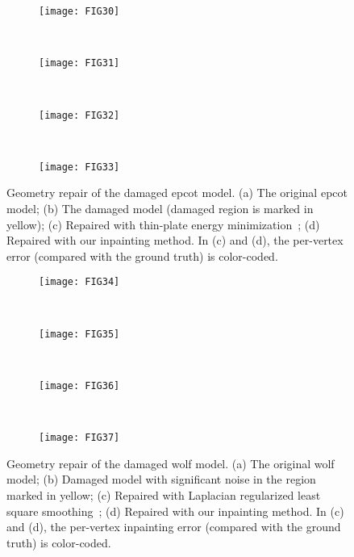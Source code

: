\begin{figure}
    \centering
    \begin{subfigure}[b]{0.23\linewidth}
        \texttt{[image: FIG30]}
        \caption{}
    \end{subfigure}%
    ~
    \begin{subfigure}[b]{0.23\linewidth}
        \texttt{[image: FIG31]}
        \caption{}
    \end{subfigure}
    ~
    \begin{subfigure}[b]{0.23\linewidth}
        \texttt{[image: FIG32]}
        \caption{}
    \end{subfigure}
    ~
    \begin{subfigure}[b]{0.23\linewidth}
        \texttt{[image: FIG33]}
        \caption{}
    \end{subfigure}
    \caption[Geometry repair of the damaged epcot model.]
    {Geometry repair of the damaged epcot model. (a) The original epcot model;
    (b) The damaged model (damaged region is marked in yellow); (c) Repaired with thin-plate
    energy minimization~\cite{Bac2008}; (d) Repaired with our inpainting method. In (c) and (d),
    the per-vertex error (compared with the ground truth) is color-coded. }
\label{fig:repair:epcot}
\end{figure}

\begin{figure}
    \centering
    \begin{subfigure}[b]{0.35\linewidth}
        \texttt{[image: FIG34]}
        \caption{}
    \end{subfigure}%
    ~
    \begin{subfigure}[b]{0.35\linewidth}
        \texttt{[image: FIG35]}
        \caption{}
    \end{subfigure}
    \\
    \begin{subfigure}[b]{0.35\linewidth}
        \texttt{[image: FIG36]}
        \caption{}
    \end{subfigure}
    ~
    \begin{subfigure}[b]{0.35\linewidth}
        \texttt{[image: FIG37]}
        \caption{}
    \end{subfigure}
    \caption[Geometry repair of the damaged wolf model.]
    {Geometry repair of the damaged wolf model.
         (a) The original wolf model; (b) Damaged model with significant noise in the region marked in yellow;
         (c) Repaired with Laplacian regularized least square smoothing~\cite{Nealen2006};
         (d) Repaired with our inpainting method. In (c) and (d), the per-vertex inpainting error (compared with the ground truth)
          is color-coded. }
\label{fig:repair:wolf}
\end{figure}

